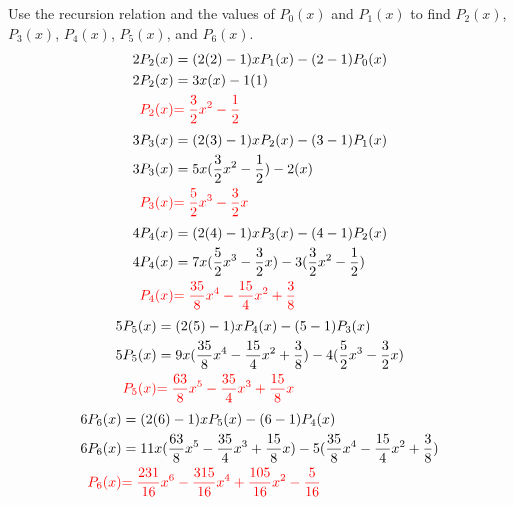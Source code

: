 \item[3.] Use the recursion relation and the values of $P_0(x)$ and $P_1(x)$ to find $P_2(x)$, $P_3(x)$, $P_4(x)$, $P_5(x)$, and $P_6(x)$.
\begin{align*}
    2P_{2}(x) &= (2({2}) - 1)xP_{1}(x) - ({2}-1)P_{0}(x)\\
    2P_2(x) &= 3x(x)-1(1)\\
    \textcolor{red}{P_2(x)} &\textcolor{red}{= \frac{3}{2}x^2-\frac{1}{2}}\\
\end{align*}
\begin{align*}
    3P_{3}(x) &= (2({3}) - 1)xP_{2}(x) - ({3}-1)P_{1}(x)\\
    3P_3(x) &= 5x(\frac{3}{2}x^2-\frac{1}{2})-2(x)\\
    \textcolor{red}{P_3(x)} &\textcolor{red}{= \frac{5}{2}x^3-\frac{3}{2}x}\\
\end{align*}
\begin{align*}
    4P_{4}(x) &= (2({4}) - 1)xP_{3}(x) - ({4}-1)P_{2}(x)\\
    4P_4(x) &= 7x(\frac{5}{2}x^3-\frac{3}{2}x)-3(\frac{3}{2}x^2-\frac{1}{2})\\
    \textcolor{red}{P_4(x)} &\textcolor{red}{= \frac{35}{8}x^4-\frac{15}{4}x^2+\frac{3}{8}}\\
\end{align*}
\begin{align*}
    5P_{5}(x) &= (2({5}) - 1)xP_{4}(x) - ({5}-1)P_{3}(x)\\
    5P_5(x) &= 9x(\frac{35}{8}x^4-\frac{15}{4}x^2+\frac{3}{8})-4(\frac{5}{2}x^3-\frac{3}{2}x)\\
    \textcolor{red}{P_5(x)} &\textcolor{red}{= \frac{63}{8}x^5-\frac{35}{4}x^3+\frac{15}{8}x}\\
\end{align*}
\begin{align*}
    6P_{6}(x) &= (2({6}) - 1)xP_{5}(x) - ({6}-1)P_{4}(x)\\
    6P_6(x) &= 11x(\frac{63}{8}x^5-\frac{35}{4}x^3+\frac{15}{8}x)-5(\frac{35}{8}x^4-\frac{15}{4}x^2+\frac{3}{8})\\
    \textcolor{red}{P_6(x)} &\textcolor{red}{= \frac{231}{16}x^6-\frac{315}{16}x^4+\frac{105}{16}x^2-\frac{5}{16}}\\
\end{align*}